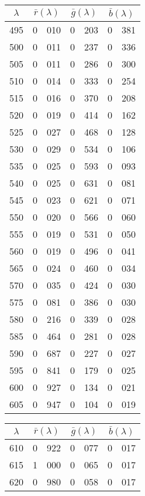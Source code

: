 {{\begin{minipage}{.3\textwidth}
\begin{tabular}{c|r@{.}l | r@{.}l | r@{.}l}
$\lambda$ & \multicolumn{2}{c|}{$\bar r(\lambda)$} &  \multicolumn{2}{c|}{$\bar g(\lambda)$} &  \multicolumn{2}{c}{$\bar b(\lambda)$} \\
\hline
 495 &   0&010 &   0&203 &   0&381 \\
 500 &   0&011 &   0&237 &   0&336 \\
 505 &   0&011 &   0&286 &   0&300 \\
 510 &   0&014 &   0&333 &   0&254 \\
 515 &   0&016 &   0&370 &   0&208 \\
 520 &   0&019 &   0&414 &   0&162 \\
 525 &   0&027 &   0&468 &   0&128 \\
 530 &   0&029 &   0&534 &   0&106 \\
 535 &   0&025 &   0&593 &   0&093 \\
 540 &   0&025 &   0&631 &   0&081 \\
 545 &   0&023 &   0&621 &   0&071 \\
 550 &   0&020 &   0&566 &   0&060 \\
 555 &   0&019 &   0&531 &   0&050 \\
 560 &   0&019 &   0&496 &   0&041 \\
 565 &   0&024 &   0&460 &   0&034 \\
 570 &   0&035 &   0&424 &   0&030 \\
 575 &   0&081 &   0&386 &   0&030 \\
 580 &   0&216 &   0&339 &   0&028 \\
 585 &   0&464 &   0&281 &   0&028 \\
 590 &   0&687 &   0&227 &   0&027 \\
 595 &   0&841 &   0&179 &   0&025 \\
 600 &   0&927 &   0&134 &   0&021 \\
 605 &   0&947 &   0&104 &   0&019 \\
\end{tabular}
\end{minipage}\hfill
\begin{minipage}{.3\textwidth}
\centering
\begin{tabular}{c|r@{.}l | r@{.}l | r@{.}l}
$\lambda$ & \multicolumn{2}{c|}{$\bar r(\lambda)$} &  \multicolumn{2}{c|}{$\bar g(\lambda)$} &  \multicolumn{2}{c}{$\bar b(\lambda)$} \\
\hline
 610 &   0&922 &   0&077 &   0&017 \\
 615 &   1&000 &   0&065 &   0&017 \\
 620 &   0&980 &   0&058 &   0&017 \\

\end{tabular}
\end{minipage}}}
